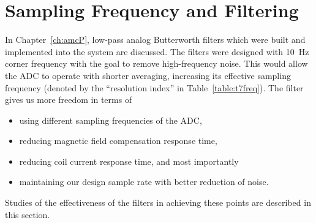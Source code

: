 

\section{Sampling Frequency and Filtering}\label{sec:freq}


In Chapter~\ref{ch:amcP}, low-pass analog Butterworth
filters which were built and implemented into the system are discussed.  The filters
were designed with 10~Hz corner frequency with the goal to remove
high-frequency noise.  This would allow the ADC to operate with shorter
averaging, increasing its effective sampling frequency (denoted by the
``resolution index'' in Table~\ref{table:t7freq}).  The filter gives
us more freedom in terms of
\begin{itemize}
    \item using different sampling frequencies of the ADC,
    \item reducing magnetic field compensation response time,
    \item reducing coil current response time, and most importantly
    \item maintaining our design sample rate with better reduction of noise.
\end{itemize}
Studies of the effectiveness of the filters in achieving these
points are described in this section.



